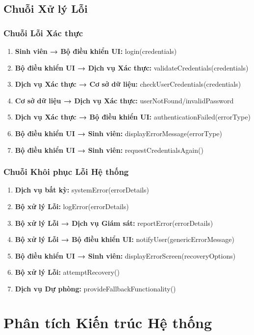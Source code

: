 \subsection{Chuỗi Xử lý Lỗi}

\subsubsection{Chuỗi Lỗi Xác thực}
\begin{enumerate}
    \item \textbf{Sinh viên → Bộ điều khiển UI:} login(credentials)
    \item \textbf{Bộ điều khiển UI → Dịch vụ Xác thực:} validateCredentials(credentials)
    \item \textbf{Dịch vụ Xác thực → Cơ sở dữ liệu:} checkUserCredentials(credentials)
    \item \textbf{Cơ sở dữ liệu → Dịch vụ Xác thực:} userNotFound/invalidPassword
    \item \textbf{Dịch vụ Xác thực → Bộ điều khiển UI:} authenticationFailed(errorType)
    \item \textbf{Bộ điều khiển UI → Sinh viên:} displayErrorMessage(errorType)
    \item \textbf{Bộ điều khiển UI → Sinh viên:} requestCredentialsAgain()
\end{enumerate}

\subsubsection{Chuỗi Khôi phục Lỗi Hệ thống}
\begin{enumerate}
    \item \textbf{Dịch vụ bất kỳ:} systemError(errorDetails)
    \item \textbf{Bộ xử lý Lỗi:} logError(errorDetails)
    \item \textbf{Bộ xử lý Lỗi → Dịch vụ Giám sát:} reportError(errorDetails)
    \item \textbf{Bộ xử lý Lỗi → Bộ điều khiển UI:} notifyUser(genericErrorMessage)
    \item \textbf{Bộ điều khiển UI → Sinh viên:} displayErrorScreen(recoveryOptions)
    \item \textbf{Bộ xử lý Lỗi:} attemptRecovery()
    \item \textbf{Dịch vụ Dự phòng:} provideFallbackFunctionality()
\end{enumerate}

\section{Phân tích Kiến trúc Hệ thống}
\label{sec:system-architecture}

